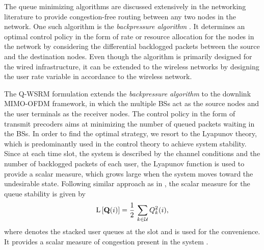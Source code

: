 
The queue minimizing algorithms are discussed extensively in the networking literature to provide congestion-free routing between any two nodes in the network. One such algorithm  is the \emph{backpressure algorithm} \cite{tassiulas,georgiadis2006resource,neely2010stochastic}. It determines an optimal control policy in the form of rate or resource allocation for the nodes in the network by considering the differential backlogged packets between the source and the destination nodes. Even though the algorithm is primarily designed for the wired infrastructure, it can be extended to the wireless networks by designing the user rate variable  in accordance to the wireless network.

The \ac{Q-WSRM} formulation extends the \emph{backpressure algorithm} to the downlink \ac{MIMO}-\ac{OFDM} framework, in which the multiple \acp{BS} act as the source nodes and the user terminals as the receiver nodes. The control policy in the form of transmit precoders aims at minimizing the number of queued packets waiting in the \acp{BS}. In order to find the optimal strategy, we resort to the Lyapunov theory, which is predominantly used in the control theory to achieve system stability. Since at each time slot, the system is described by the channel conditions and the number of backlogged packets of each user, the Lyapunov function is used to provide a scalar measure, which grows large when the system moves toward the undesirable state. Following similar approach as in \cite{neely2010stochastic}, the scalar measure for the queue stability is given by
\begin{equation}
\mathrm{L}\left [ \mathbf{Q}(i) \right ] = \frac{1}{2} \, \sum_{k \in \mathcal{U}} Q_k^2(i),
\end{equation}
where  denotes the stacked user queues at the  slot and  is used for the convenience. It provides a scalar measure of congestion present in the system \cite[Ch. 3]{neely2010stochastic}. 

